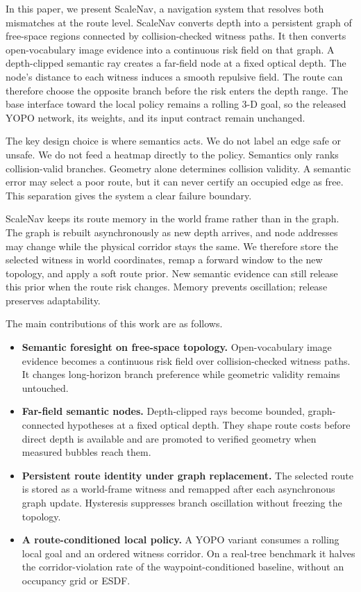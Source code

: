 \documentclass[letterpaper,10pt,conference]{ieeeconf}
\begin{document}
In this paper, we present ScaleNav, a navigation system that resolves both
mismatches at the route level. ScaleNav converts depth into a persistent
graph of free-space regions connected by collision-checked witness paths.
It then converts open-vocabulary image evidence into a continuous risk field
on that graph. A depth-clipped semantic ray creates a far-field node at a
fixed optical depth. The node's distance to each witness induces a smooth
repulsive field. The route can therefore choose the opposite branch before
the risk enters the depth range. The base interface toward the local policy
remains a rolling 3-D goal, so the released YOPO network, its weights, and
its input contract remain unchanged.

The key design choice is where semantics acts. We do not label an edge safe
or unsafe. We do not feed a heatmap directly to the policy. Semantics only
ranks collision-valid branches. Geometry alone determines collision validity.
A semantic error may select a poor route, but it can never certify an
occupied edge as free. This separation gives the system a clear failure
boundary.

ScaleNav keeps its route memory in the world frame rather than in the graph.
The graph is rebuilt asynchronously as new depth arrives, and node addresses
may change while the physical corridor stays the same. We therefore store the
selected witness in world coordinates, remap a forward window to the new
topology, and apply a soft route prior. New semantic evidence can still
release this prior when the route risk changes. Memory prevents oscillation;
release preserves adaptability.

The main contributions of this work are as follows.
\begin{itemize}
  \item \textbf{Semantic foresight on free-space topology.}
  Open-vocabulary image evidence becomes a continuous risk field over
  collision-checked witness paths. It changes long-horizon branch preference
  while geometric validity remains untouched.
  \item \textbf{Far-field semantic nodes.}
  Depth-clipped rays become bounded, graph-connected hypotheses at a fixed
  optical depth. They shape route costs before direct depth is available and
  are promoted to verified geometry when measured bubbles reach them.
  \item \textbf{Persistent route identity under graph replacement.}
  The selected route is stored as a world-frame witness and remapped after
  each asynchronous graph update. Hysteresis suppresses branch oscillation
  without freezing the topology.
  \item \textbf{A route-conditioned local policy.}
  A YOPO variant consumes a rolling local goal and an ordered witness
  corridor. On a real-tree benchmark it halves the corridor-violation rate of
  the waypoint-conditioned baseline, without an occupancy grid or ESDF.
\end{itemize}
\end{document}
